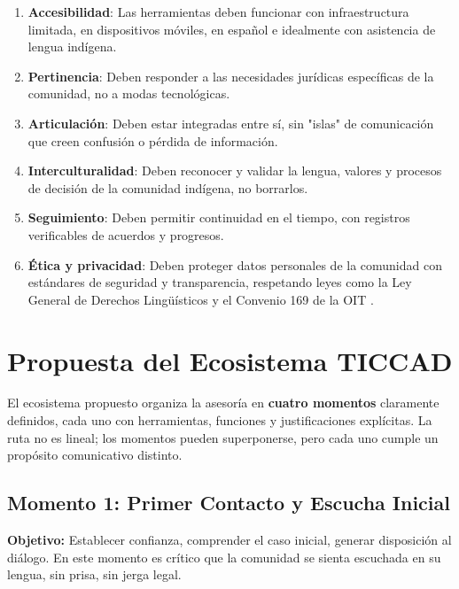﻿\documentclass[
  spanish,
  letterpaper, oneside
]{article}
\begin{document}
\begin{enumerate}
  \item \textbf{Accesibilidad}: Las herramientas deben funcionar con infraestructura limitada, 
  en dispositivos móviles, en español e idealmente con asistencia de lengua indígena.
  
  \item \textbf{Pertinencia}: Deben responder a las necesidades jurídicas específicas de la comunidad, 
  no a modas tecnológicas.
  
  \item \textbf{Articulación}: Deben estar integradas entre sí, sin "islas" de comunicación que 
  creen confusión o pérdida de información.
  
  \item \textbf{Interculturalidad}: Deben reconocer y validar la lengua, valores y procesos de 
  decisión de la comunidad indígena, no borrarlos.
  
  \item \textbf{Seguimiento}: Deben permitir continuidad en el tiempo, con registros verificables 
  de acuerdos y progresos.
  
  \item \textbf{Ética y privacidad}: Deben proteger datos personales de la comunidad con estándares 
  de seguridad y transparencia, respetando leyes como la Ley General de Derechos Lingüísticos 
  y el Convenio 169 de la OIT \cite{cpeum2026,leyDerechosLinguisticos2024,oit1691989}.
\end{enumerate}

\section{Propuesta del Ecosistema TICCAD}

El ecosistema propuesto organiza la asesoría en \textbf{cuatro momentos} claramente definidos, 
cada uno con herramientas, funciones y justificaciones explícitas. La ruta no es lineal; 
los momentos pueden superponerse, pero cada uno cumple un propósito comunicativo distinto.

\subsection{Momento 1: Primer Contacto y Escucha Inicial}

\textbf{Objetivo:} Establecer confianza, comprender el caso inicial, generar disposición 
al diálogo. En este momento es crítico que la comunidad se sienta escuchada en su lengua, 
sin prisa, sin jerga legal.
\end{document}
